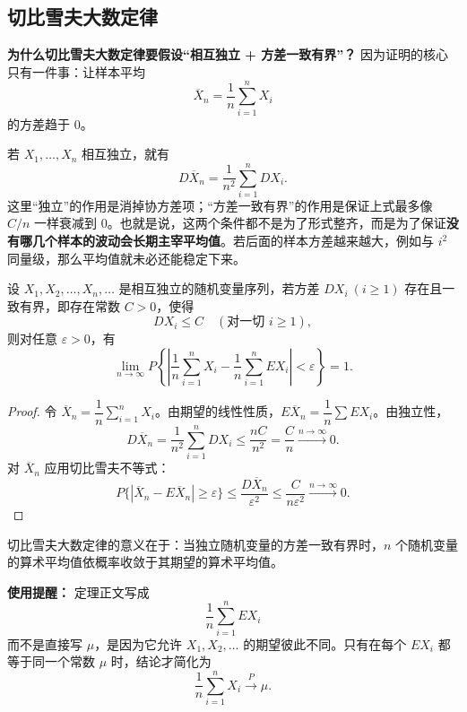 ﻿\documentclass[lang=cn,11pt]{elegantbook}
\begin{document}
\subsection{切比雪夫大数定律}

\begin{note}
\textbf{为什么切比雪夫大数定律要假设“相互独立 + 方差一致有界”？} 因为证明的核心只有一件事：让样本平均
\[
\overline{X}_n=\frac1n\sum_{i=1}^n X_i
\]
的方差趋于 0。

若 \(X_1,\dots,X_n\) 相互独立，就有
\[
D\overline{X}_n=\frac1{n^2}\sum_{i=1}^n DX_i.
\]
这里“独立”的作用是消掉协方差项；“方差一致有界”的作用是保证上式最多像 \(C/n\) 一样衰减到 0。也就是说，这两个条件都不是为了形式整齐，而是为了保证\textbf{没有哪几个样本的波动会长期主宰平均值}。若后面的样本方差越来越大，例如与 \(i^2\) 同量级，那么平均值就未必还能稳定下来。
\end{note}

\begin{theorem}[切比雪夫大数定律] \label{thm:chebyshev-lln}
设 \(X_1, X_2, \dots, X_n, \dots\) 是相互独立的随机变量序列，若方差 \(DX_i\ (i \geq 1)\) 存在且一致有界，即存在常数 \(C > 0\)，使得
\[
DX_i \leq C \quad (\text{对一切 } i \geq 1),
\]
则对任意 \(\varepsilon > 0\)，有
\[
\lim_{n\to\infty} P\!\left\{\left|\frac{1}{n}\sum_{i=1}^{n} X_i - \frac{1}{n}\sum_{i=1}^{n} EX_i\right| < \varepsilon\right\} = 1.
\]
\end{theorem}
\begin{proof}
令 \(\overline{X}_n = \dfrac{1}{n}\sum_{i=1}^{n} X_i\)。由期望的线性性质，\(E\overline{X}_n = \dfrac{1}{n}\sum EX_i\)。由独立性，
\[
D\overline{X}_n = \frac{1}{n^2}\sum_{i=1}^{n} DX_i \leq \frac{nC}{n^2} = \frac{C}{n} \xrightarrow{n\to\infty} 0.
\]
对 \(\overline{X}_n\) 应用切比雪夫不等式：
\[
P\{|\overline{X}_n - E\overline{X}_n| \geqslant \varepsilon\} \leqslant \frac{D\overline{X}_n}{\varepsilon^2} \leqslant \frac{C}{n\varepsilon^2} \xrightarrow{n\to\infty} 0.
\]
\end{proof}

\begin{note}
切比雪夫大数定律的意义在于：当独立随机变量的方差一致有界时，\(n\) 个随机变量的算术平均值依概率收敛于其期望的算术平均值。

\textbf{使用提醒：} 定理正文写成
\[
\frac1n\sum_{i=1}^n EX_i
\]
而不是直接写 \(\mu\)，是因为它允许 \(X_1,X_2,\dots\) 的期望彼此不同。只有在每个 \(EX_i\) 都等于同一个常数 \(\mu\) 时，结论才简化为
\[
\frac{1}{n}\sum_{i=1}^{n} X_i \stackrel{P}{\longrightarrow} \mu.
\]
\end{note}
\end{document}
